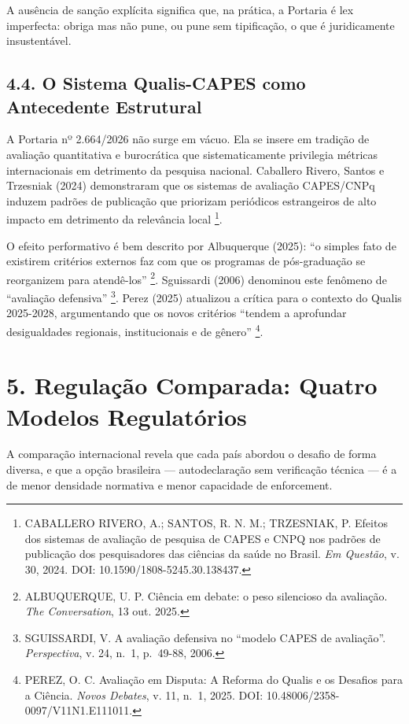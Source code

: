 \documentclass[
  12pt,
  a4paper,
  brazil,
  twoside
]{report}
\begin{document}
A ausência de sanção explícita significa que, na prática, a Portaria é
lex imperfecta: obriga mas não pune, ou pune sem tipificação, o que é
juridicamente insustentável.

\subsection{4.4. O Sistema Qualis-CAPES como Antecedente
Estrutural}\label{o-sistema-qualis-capes-como-antecedente-estrutural}

A Portaria nº 2.664/2026 não surge em vácuo. Ela se insere em tradição
de avaliação quantitativa e burocrática que sistematicamente privilegia
métricas internacionais em detrimento da pesquisa nacional. Caballero
Rivero, Santos e Trzesniak (2024) demonstraram que os sistemas de
avaliação CAPES/CNPq induzem padrões de publicação que priorizam
periódicos estrangeiros de alto impacto em detrimento da relevância
local \footnote{CABALLERO RIVERO, A.; SANTOS, R. N. M.; TRZESNIAK, P.
  Efeitos dos sistemas de avaliação de pesquisa de CAPES e CNPQ nos
  padrões de publicação dos pesquisadores das ciências da saúde no
  Brasil. \emph{Em Questão}, v. 30, 2024. DOI:
  10.1590/1808-5245.30.138437.}.

O efeito performativo é bem descrito por Albuquerque (2025): ``o simples
fato de existirem critérios externos faz com que os programas de
pós-graduação se reorganizem para atendê-los'' \footnote{ALBUQUERQUE, U.
  P. Ciência em debate: o peso silencioso da avaliação. \emph{The
  Conversation}, 13 out. 2025.}. Sguissardi (2006) denominou este
fenômeno de ``avaliação defensiva'' \footnote{SGUISSARDI, V. A avaliação
  defensiva no ``modelo CAPES de avaliação''. \emph{Perspectiva}, v. 24,
  n.~1, p.~49-88, 2006.}. Perez (2025) atualizou a crítica para o
contexto do Qualis 2025-2028, argumentando que os novos critérios
``tendem a aprofundar desigualdades regionais, institucionais e de
gênero'' \footnote{PEREZ, O. C. Avaliação em Disputa: A Reforma do
  Qualis e os Desafios para a Ciência. \emph{Novos Debates}, v. 11,
  n.~1, 2025. DOI: 10.48006/2358-0097/V11N1.E111011.}.

\section{5. Regulação Comparada: Quatro Modelos
Regulatórios}\label{regulauxe7uxe3o-comparada-quatro-modelos-regulatuxf3rios}

A comparação internacional revela que cada país abordou o desafio de
forma diversa, e que a opção brasileira --- autodeclaração sem
verificação técnica --- é a de menor densidade normativa e menor
capacidade de enforcement.
\end{document}
